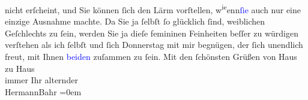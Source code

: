                     nicht erſcheint, und Sie können ſich den Lärm vorſtellen, w\substVorne{}\textsuperscript{ie}\substDazwischen{}enn\substHinten{}{ }\textcolor{blue}{ſie}{} auch nur eine einzige
                    Ausnahme machte. Da Sie ja ſelbſt ſo glücklich ſind, weiblichen Geſchlechts zu
                    ſein, werden Sie ja dieſe femininen Feinheiten beſſer zu würdigen verſtehen als
                    ich ſelbſt und ſich Donnerstag mit mir begnügen, der ſich unendlich
                    freut, mit Ihnen \textcolor{blue}{beiden}{}
                    zuſammen zu ſein.\pend
           \pstart
           Mit den ſchönsten Grüßen von Haus zu Haus{\\[\baselineskip]}immer Ihr alternder{\\[\baselineskip]}\spacefill\mbox{HermannBahr}\pend
           \leftskip=0em{}\endnumbering{}  
      